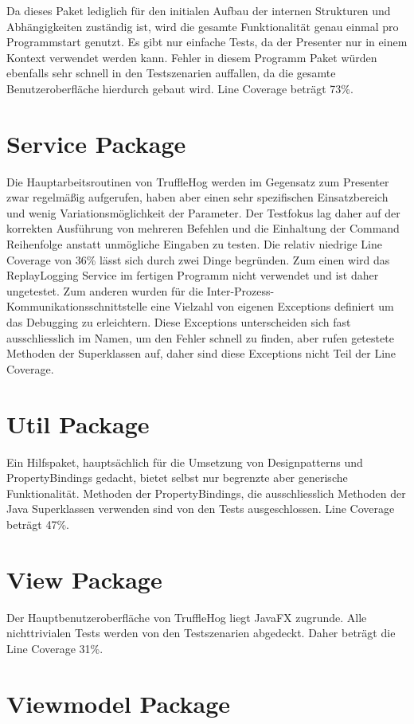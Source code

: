 Da dieses Paket lediglich für den initialen Aufbau der internen Strukturen und Abhängigkeiten zuständig ist, wird die gesamte Funktionalität genau einmal pro Programmstart genutzt. Es gibt nur einfache Tests, da der Presenter nur in einem Kontext verwendet werden kann. Fehler in diesem Programm Paket würden ebenfalls sehr schnell in den Testszenarien auffallen, da die gesamte Benutzeroberfläche hierdurch gebaut wird. Line Coverage beträgt 73\%.

\section{Service Package}

Die Hauptarbeitsroutinen von TruffleHog werden im Gegensatz zum Presenter zwar regelmäßig aufgerufen, haben aber einen sehr spezifischen Einsatzbereich und wenig Variationsmöglichkeit der Parameter. Der Testfokus lag daher auf der korrekten Ausführung von mehreren Befehlen und die Einhaltung der Command Reihenfolge anstatt unmögliche Eingaben zu testen. Die relativ niedrige Line Coverage von 36\% lässt sich durch zwei Dinge begründen. Zum einen wird das ReplayLogging Service im fertigen Programm nicht verwendet und ist daher ungetestet. Zum anderen wurden für die Inter-Prozess-Kommunikationsschnittstelle eine Vielzahl von eigenen Exceptions definiert um das Debugging zu erleichtern. Diese Exceptions unterscheiden sich fast ausschliesslich im Namen, um den Fehler schnell zu finden, aber rufen getestete Methoden der Superklassen auf, daher sind diese Exceptions nicht Teil der Line Coverage.

\section{Util Package}

Ein Hilfspaket, hauptsächlich für die Umsetzung von Designpatterns und PropertyBindings gedacht, bietet selbst nur begrenzte aber generische Funktionalität. Methoden der PropertyBindings, die ausschliesslich Methoden der Java Superklassen verwenden sind von den Tests ausgeschlossen. Line Coverage beträgt 47\%.

\section{View Package} %

Der Hauptbenutzeroberfläche von TruffleHog liegt JavaFX zugrunde. Alle nichttrivialen Tests werden von den Testszenarien abgedeckt. Daher beträgt die Line Coverage 31\%.

\section{Viewmodel Package} %
